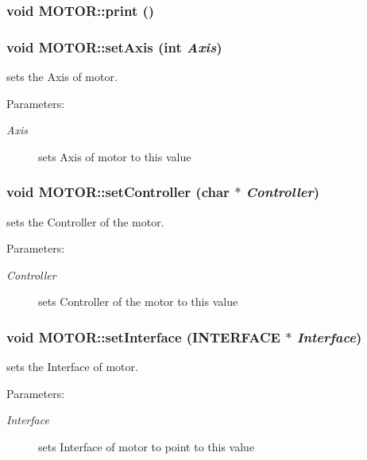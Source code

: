 \subsubsection{\setlength{\rightskip}{0pt plus 5cm}void MOTOR::print ()}\label{classMOTOR_1a8bf2eb8dac81105788526f9fa35075}


\subsubsection{\setlength{\rightskip}{0pt plus 5cm}void MOTOR::set\-Axis (int {\em Axis})}\label{classMOTOR_61fa8fee9c892cb921e58c6dac08dccd}


sets the Axis of motor. \begin{Desc}
\item[Parameters:]
\begin{description}
\item[{\em Axis}]sets Axis of motor to this value \end{description}
\end{Desc}
\subsubsection{\setlength{\rightskip}{0pt plus 5cm}void MOTOR::set\-Controller (char $\ast$ {\em Controller})}\label{classMOTOR_a996a3621cab95ae1ba0a7fedc399a95}


sets the Controller of the motor. \begin{Desc}
\item[Parameters:]
\begin{description}
\item[{\em Controller}]sets Controller of the motor to this value \end{description}
\end{Desc}
\subsubsection{\setlength{\rightskip}{0pt plus 5cm}void MOTOR::set\-Interface (\bf{INTERFACE} $\ast$ {\em Interface})}\label{classMOTOR_79c7f677490d49103857f5b08e34b107}


sets the Interface of motor. \begin{Desc}
\item[Parameters:]
\begin{description}
\item[{\em Interface}]sets Interface of motor to point to this value \end{description}
\end{Desc}

